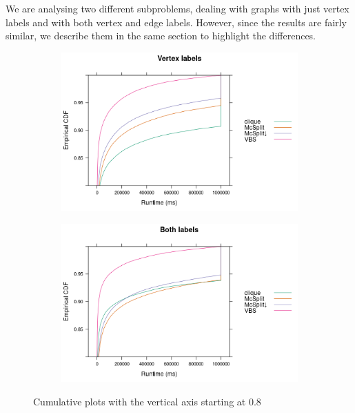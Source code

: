 \documentclass{l4proj}
\theoremstyle{definition}
\theoremstyle{remark}
\begin{document}
We are analysing two different subproblems, dealing with graphs with just vertex
labels and with both vertex and edge labels. However, since the results are
fairly similar, we describe them in the same section to highlight the
differences.

\begin{figure}
  \centering
  \begin{subfigure}[t]{0.49\textwidth}
    \centering
    \includegraphics[width=\textwidth]{images/ecdf_vertex_labels.png}
  \end{subfigure}
  \begin{subfigure}[t]{0.49\textwidth}
    \centering
    \includegraphics[width=\textwidth]{images/ecdf_both_labels.png}
  \end{subfigure}
  \caption{Cumulative plots with the vertical axis starting at 0.8}
  \label{fig:ecdfs}
\end{figure}
\end{document}
